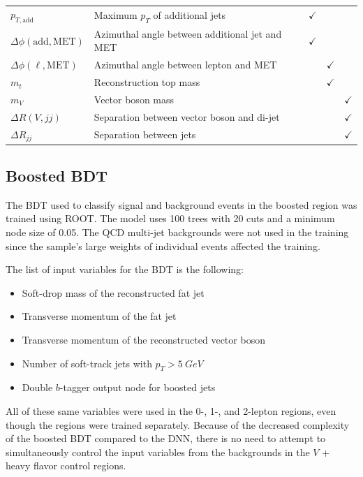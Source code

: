 \begin{table}
\begin{tabularx}{\textwidth}{|l|X|c|c|c|}
    $p_{T,\mathrm{add}}$ & Maximum $p_T$ of additional jets & $\checkmark$ & & \\
    $\Delta\phi(\mathrm{add, MET})$ & Azimuthal angle between additional jet and MET & $\checkmark$ & & \\
    \hline
    $\Delta\phi(\ell, \mathrm{MET})$ & Azimuthal angle between lepton and MET & & $\checkmark$ & \\
    $m_t$ & Reconstruction top mass & & $\checkmark$ & \\
    $m_V$ & Vector boson mass & & & $\checkmark$ \\
    \hline
    $\Delta R(V, jj)$ & Separation between vector boson and di-jet & & & $\checkmark$ \\
    $\Delta R_{jj}$ & Separation between jets & & & $\checkmark$ \\
    \hline
  \end{tabularx}
  \label{tab:dnn-inputs}
\end{table}

\subsection{Boosted BDT}

The BDT used to classify signal and background events in the boosted region
was trained using ROOT.
The model uses 100 trees with 20 cuts and a minimum node size of 0.05.
The QCD multi-jet backgrounds were not used in the training since the sample's large weights
of individual events affected the training.

The list of input variables for the BDT is the following:
\begin{itemize}
\item Soft-drop mass of the reconstructed fat jet
\item Transverse momentum of the fat jet
\item Transverse momentum of the reconstructed vector boson
\item Number of soft-track jets with $p_T > \SI{5}{GeV}$
\item Double $b$-tagger output node for boosted jets
\end{itemize}
All of these same variables were used in the 0-, 1-, and 2-lepton regions,
even though the regions were trained separately.
Because of the decreased complexity of the boosted BDT compared to the DNN,
there is no need to attempt to simultaneously control the input variables from the backgrounds
in the $V$ + heavy flavor control regions.

